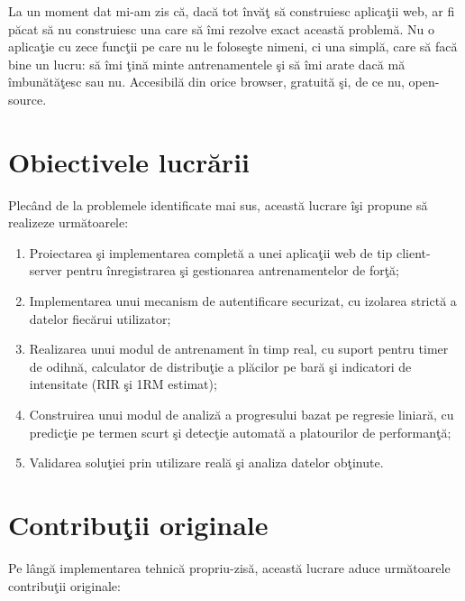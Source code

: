La un moment dat mi-am zis c\u a, dac\u a tot \^ inv\u a\c t s\u a construiesc
aplica\c tii web, ar fi p\u acat s\u a nu construiesc una care s\u a \^ imi
rezolve exact aceast\u a problem\u a. Nu o aplica\c tie cu zece func\c tii pe
care nu le folose\c ste nimeni, ci una simpl\u a, care s\u a fac\u a bine
un lucru: s\u a \^ imi \c tin\u a minte antrenamentele \c si s\u a \^ imi
arate dac\u a m\u a \^ imbun\u at\u a\c tesc sau nu. Accesibil\u a din orice
browser, gratuit\u a \c si, de ce nu, open-source.

\section{Obiectivele lucr\u arii}

Plec\^ and de la problemele identificate mai sus, aceast\u a lucrare
\^ i\c si propune s\u a realizeze urm\u atoarele:

\begin{enumerate}
  \item Proiectarea \c si implementarea complet\u a a unei aplica\c tii
        web de tip client-server pentru \^ inregistrarea \c si gestionarea
        antrenamentelor de for\c t\u a;
  \item Implementarea unui mecanism de autentificare securizat, cu
        izolarea strict\u a a datelor fiec\u arui utilizator;
  \item Realizarea unui modul de antrenament \^ in timp real, cu suport
        pentru timer de odihn\u a, calculator de distribu\c tie a
        pl\u acilor pe bar\u a \c si indicatori de intensitate
        (RIR \c si 1RM estimat);
  \item Construirea unui modul de analiz\u a a progresului bazat pe
        regresie liniar\u a, cu predic\c tie pe termen scurt \c si
        detec\c tie automat\u a a platourilor de performan\c t\u a;
  \item Validarea solu\c tiei prin utilizare real\u a \c si analiza
        datelor ob\c tinute.
\end{enumerate}

\section{Contribu\c tii originale}

Pe l\^ ang\u a implementarea tehnic\u a propriu-zis\u a, aceast\u a lucrare
aduce urm\u atoarele contribu\c tii originale:

